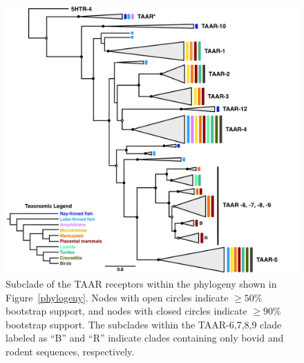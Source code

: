 \documentclass[fleqn,10pt]{wlpeerj}
\begin{document}
\begin{figure}[htbp]
	\centerline{\includegraphics[width=15cm]{figures/taar_taxonomy.pdf}}
	\caption{\label{taar_tree} Subclade of the TAAR receptors within the phylogeny shown in Figure~\ref{phylogeny}. Nodes with open circles indicate $\geq 50\%$ bootstrap support, and nodes with closed circles indicate $\geq 90\%$ bootstrap support. The subclades within the TAAR-6,7,8,9 clade labeled as ``B'' and ``R'' indicate clades containing only bovid and rodent sequences, respectively.}
\end{figure}
\end{document}
